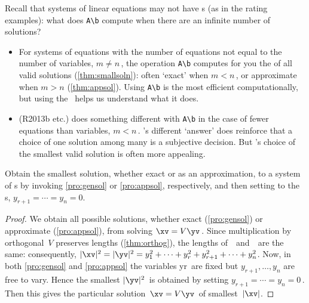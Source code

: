 Recall that systems of linear equations may not have s (as in the rating examples): what does \verb|A\b| compute when there are an infinite number of solutions?
\begin{itemize}
\item For systems of equations with the number of equations not equal to the number of variables, \(m\neq n\)\,, the \script[2] operation \verb|A\b| computes for you the \emph{} of all valid solutions (\autoref{thm:smallsoln}): often `exact' when \(m<n\)\,, or approximate when \(m>n\) (\autoref{thm:appsol}).  
Using \verb|A\b| is the most efficient computationally, but using the \svd\ helps us understand what it does.

\item \script[1] (R2013b etc.) does something different with \verb|A\b| in the case of fewer equations than variables, \(m<n\)\,. 
\script[1]'s different `answer' does reinforce that a choice of one solution among many is a subjective decision.
But \script[2]'s choice of the smallest valid solution is often more appealing.

\end{itemize}

\begin{theorem} \label{thm:smallsoln}
Obtain the {smallest solution}, whether exact or as an approximation, to a system of s by invoking \autoref{pro:gensol} or \autoref{pro:appsol}, respectively, and then setting to  the s, \(y_{r+1}=\cdots=y_n=0\).
\end{theorem}
\begin{proof} %
We obtain all possible solutions, whether exact (\autoref{pro:gensol}) or approximate (\autoref{pro:appsol}), from solving \(\xv=V\yv\)\,.
Since multiplication by orthogonal~\(V\) preserves lengths (\autoref{thm:orthog}), the lengths of~\xv\ and~\yv\ are the same: consequently, \(|\xv|^2=|\yv|^2=y_1^2+\cdots+y_r^2+y_{r+1}^2+\cdots+y_n^2\).  
Now, in both \autoref{pro:gensol} and \autoref{pro:appsol} the variables \hlist yr\ are fixed but \(y_{r+1},\ldots,y_n\) are free to vary.
Hence the smallest \(|\yv|^2\)~is obtained by setting \(y_{r+1}=\cdots=y_n=0\)\,. 
Then this gives the particular solution~\(\xv=V\yv\)\ of smallest~\(|\xv|\).
\end{proof}


